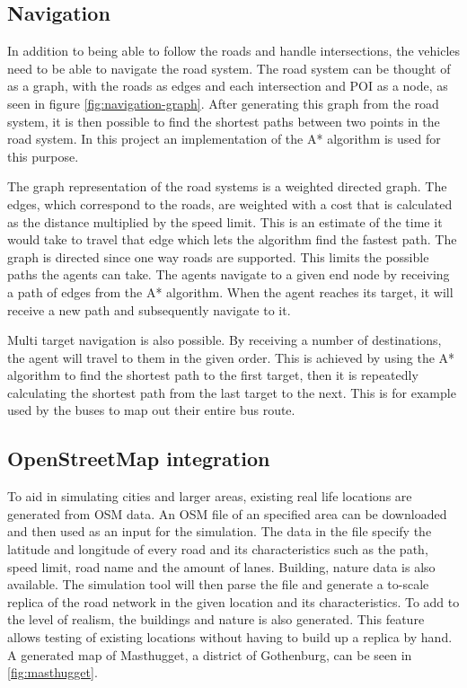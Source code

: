     \subsection{Navigation}
        In addition to being able to follow the roads and handle intersections, the vehicles need to be able to navigate the road system. The road system can be thought of as a graph, with the roads as edges and each intersection and POI as a node, as seen in figure \ref{fig:navigation-graph}. After generating this graph from the road system, it is then possible to find the shortest paths between two points in the road system. In this project an implementation of the A* algorithm is used for this purpose.

    
        The graph representation of the road systems is a weighted directed graph. The edges, which correspond to the roads, are weighted with a cost that is calculated as the distance multiplied by the speed limit. This is an estimate of the time it would take to travel that edge which lets the algorithm find the fastest path. The graph is directed since one way roads are supported. This limits the possible paths the agents can take. The agents navigate to a given end node by receiving a path of edges from the A* algorithm. When the agent reaches its target, it will receive a new path and subsequently navigate to it.
        
        Multi target navigation is also possible. By receiving a number of destinations, the agent will travel to them in the given order. This is achieved by using the A* algorithm to find the shortest path to the first target, then it is repeatedly calculating the shortest path from the last target to the next. This is for example used by the buses to map out their entire bus route.
        

    \subsection{OpenStreetMap integration}
        To aid in simulating cities and larger areas, existing real life locations are generated from OSM data. An OSM file of an specified area can be downloaded and then used as an input for the simulation. The data in the file specify the latitude and longitude of every road and its characteristics such as the path, speed limit, road name and the amount of lanes. Building, nature data is also available. The simulation tool will then parse the file and generate a to-scale replica of the road network in the given location and its characteristics. To add to the level of realism, the buildings and nature is also generated. This feature allows testing of existing locations without having to build up a replica by hand. A generated map of Masthugget, a district of Gothenburg, can be seen in \ref{fig:masthugget}.
        
